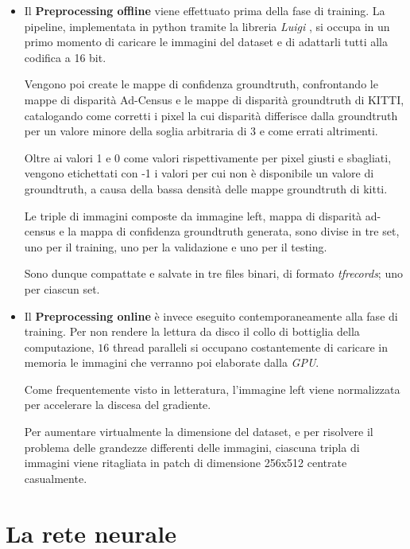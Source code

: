 \documentclass[12pt,a4paper]{report}
\begin{document}
\begin{itemize}
    \item Il \textbf{Preprocessing offline} viene effettuato prima
        della fase di training. La pipeline, implementata in python tramite
        la libreria \textit{Luigi} \cite{Luigi}, si occupa in un primo momento 
        di caricare le immagini del dataset e di adattarli tutti alla codifica a
        16 bit.

        Vengono poi create le mappe di confidenza groundtruth, confrontando le
        mappe di disparità Ad-Census e le mappe di disparità groundtruth di
        KITTI, catalogando come corretti i pixel la cui disparità differisce
        dalla groundtruth per un valore minore della soglia arbitraria di $3$ e
        come errati altrimenti. 

        Oltre ai valori 1 e 0 come valori rispettivamente per pixel giusti e
        sbagliati, vengono etichettati con -1 i valori per cui non è
        disponibile un valore di groundtruth, a causa della bassa densità delle
        mappe groundtruth di kitti.

        Le triple di immagini composte da immagine left, mappa di disparità
        ad-census e la mappa di confidenza groundtruth generata, sono divise
        in tre set, uno per il training, uno per la validazione e uno per il
        testing.

        Sono dunque compattate e salvate in tre files binari, di formato
        \textit{tfrecords}; uno per ciascun set.

    \item Il \textbf{Preprocessing online} è invece eseguito contemporaneamente
        alla fase di training. Per non rendere la lettura da disco il collo di 
        bottiglia della computazione, $16$ thread paralleli si occupano
        costantemente di caricare in memoria le immagini che verranno poi
        elaborate dalla \textit{GPU}.

        Come frequentemente visto in letteratura, l'immagine left viene
        normalizzata per accelerare la discesa del gradiente.
        
        Per aumentare virtualmente la dimensione del dataset, e per risolvere il
        problema delle grandezze differenti delle immagini, ciascuna tripla di 
        immagini viene ritagliata in patch di dimensione 256x512 centrate 
        casualmente.

\end{itemize}

\section{La rete neurale}
\end{document}
